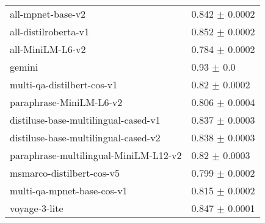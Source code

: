 \begin{table}[h!]
{\begin{tabular}{ll}
                    all-mpnet-base-v2 &                 0.842 $\pm$ 0.0002 \\
                 all-distilroberta-v1 &                 0.852 $\pm$ 0.0002 \\
                     all-MiniLM-L6-v2 &                 0.784 $\pm$ 0.0002 \\
                               gemini &                     0.93 $\pm$ 0.0 \\
           multi-qa-distilbert-cos-v1 &                  0.82 $\pm$ 0.0002 \\
              paraphrase-MiniLM-L6-v2 &                 0.806 $\pm$ 0.0004 \\
 distiluse-base-multilingual-cased-v1 &                 0.837 $\pm$ 0.0003 \\
 distiluse-base-multilingual-cased-v2 &                 0.838 $\pm$ 0.0003 \\
paraphrase-multilingual-MiniLM-L12-v2 &                  0.82 $\pm$ 0.0003 \\
            msmarco-distilbert-cos-v5 &                 0.799 $\pm$ 0.0002 \\
           multi-qa-mpnet-base-cos-v1 &                 0.815 $\pm$ 0.0002 \\
                        voyage-3-lite &                 0.847 $\pm$ 0.0001 \\
                        

\end{tabular}}
\end{table}
